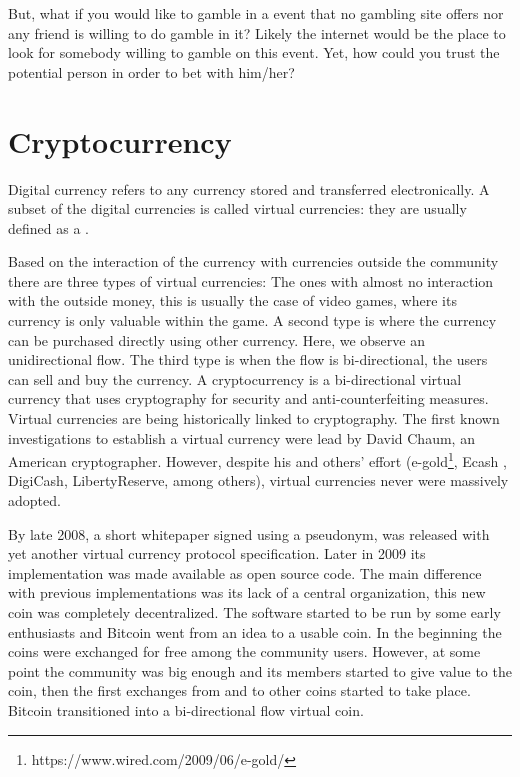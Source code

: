 But, what if you would like to gamble in a event that no gambling site offers
  nor any friend is willing to do gamble in it? Likely the internet would be the
  place to look for somebody willing to gamble on this event. Yet, how could you
  trust the potential person in order to bet with him/her?

\section{Cryptocurrency}
Digital currency refers to any currency stored and transferred
  electronically.
A subset of the digital currencies is called virtual currencies: they are
  usually defined \cite{bcentraleuro} as a .

Based on the interaction of the currency with currencies outside the
  community there are three types of virtual currencies: The ones with almost
  no interaction with the outside money, this is usually the case of video
  games, where its currency is only valuable within the game. A second
  type is where the currency can be purchased directly using other currency.
  Here, we observe an unidirectional flow. The third type is when the flow is
  bi-directional, the users can sell and buy the currency.
A cryptocurrency is a bi-directional virtual currency that uses cryptography
  for security and anti-counterfeiting measures. Virtual currencies are being
  historically linked to cryptography. The first known investigations
  \cite{chaum1983blind} to establish a virtual currency were lead by David
  Chaum, an American cryptographer. However, despite his and others' effort
  (e-gold\footnote{https://www.wired.com/2009/06/e-gold/},
  Ecash \cite{chaum1990untraceable},
  DigiCash, LibertyReserve, among others), virtual currencies never were
  massively adopted.

By late 2008, a short whitepaper \cite{nakamoto2008bitcoin} signed using a
  pseudonym, was released with yet another virtual currency protocol
  specification. Later in 2009 its implementation was made available as open
  source code. The main difference with previous implementations was its lack of
  a central organization, this new coin was completely decentralized.
The software started to be run by some early enthusiasts and Bitcoin went from
  an idea to a usable coin.
In the beginning the coins were exchanged for free among the community users.
However, at some point the community was big enough and its members started
  to give value to the coin, then the first exchanges from and to other coins
  started to take place. Bitcoin transitioned into a bi-directional flow
  virtual coin.


